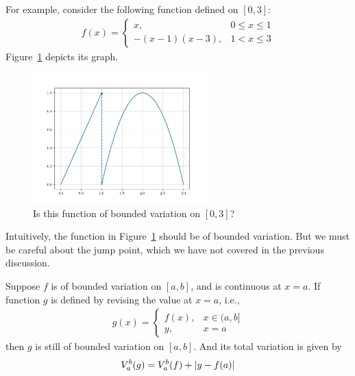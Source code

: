 \documentclass[thmcnt=section, color=blue, 12pt]{my-elegantbook}
\begin{document}
\begin{example} \label{eg:2}
	For example, consider the following function defined on $[0, 3]$:
	\begin{align*}
		f(x) = \begin{cases}
			       x,           & 0 \leq x \leq 1 \\
			       -(x-1)(x-3), & 1 < x \leq 3
		       \end{cases}
	\end{align*}
	Figure~\ref{fig:4} depicts its graph.
	\begin{figure}[H]
		\centering
		\includegraphics[width=0.6\textwidth]{figures/piecewise-function-of-bounded-variation.png}
		\caption{Is this function of bounded variation on $[0, 3]$?}
		\label{fig:4}
	\end{figure}

	Intuitively, the function in Figure~\ref{fig:4} should be of bounded variation.
	But we must be careful about the jump point,
	which we have not covered in the previous discussion.
\end{example}

\begin{proposition} \label{prop:5}
	Suppose $f$ is of bounded variation on $[a, b]$,
	and is continuous at $x = a$.
	If function $g$ is defined by revising the value at $x=a$, i.e.,
	\begin{align*}
		g(x) = \begin{cases}
			       f(x), & x \in (a, b] \\
			       y,    & x = a
		       \end{cases}
	\end{align*}
	then $g$ is still of bounded variation on $[a, b]$.
	And its total variation is given by
	\begin{align*}
		V_a^b(g) = V_a^b(f) + \left\lvert y - f(a) \right\rvert
	\end{align*}
\end{proposition}
\end{document}
